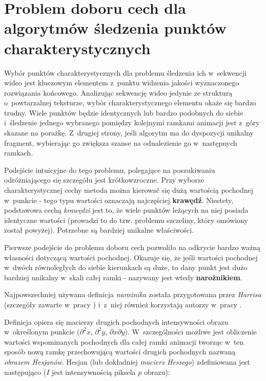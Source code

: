   \newpage
  \section{Problem doboru cech dla algorytmów śledzenia punktów charakterystycznych}\label{Section_GoodGeaturesToTrack}
    Wybór punktów charakterystycznych dla problemu śledzenia ich w~sekwencji wideo jest kluczowym elementem z~punktu widzenia jakości wyznaczonego rozwiązania końcowego. Analizując sekwencję wideo jedynie ze strukturą o~powtarzalnej teksturze, wybór charakterystycznego elementu okaże się bardzo trudny. Wiele punktów będzie identycznych lub bardzo podobnych do siebie i~śledzenie jednego wybranego pomiędzy kolejnymi ramkami animacji jest z~góry skazane na porażkę. Z~drugiej strony, jeśli algorytm ma do dyspozycji unikalny fragment, wybierając go zwiększa szanse na odnalezienie go w~następnych ramkach.

    Podejście intuicyjne do tego problemu, polegające na poszukiwaniu odróżniającego się szczegółu jest krótkowzroczne. Przy wyborze charakterystycznej cechy metoda można kierować się dużą wartością pochodnej w~punkcie - tego typu wartości oznaczają najczęściej \textbf{krawędź}. Niestety, podstawowa cechą \textit{krawędzi} jest to, że wiele punktów leżących na niej posiada identyczne wartości (prowadzi to do tzw. problemu szczeliny, który omówiony został powyżej). Potrzebne są bardziej unikalne właściwości.

    Pierwsze podejście do problemu doboru cech pozwoliło na odkrycie bardzo ważną własności dotyczącą wartości pochodnej. Okazuje się, że jeśli wartości pochodnej w~dwóch równoległych do siebie kierunkach są duże, to dany punkt jest dużo bardziej unikalny w~skali całej ramki - nazywany jest wtedy \textbf{narożnikiem}.

    Najpowszechniej używana definicja \textit{narożnika} została przygotowana przez \textit{Harrisa} (szczegóły zawarte w~pracy \cite{Harris88}) i~z~niej również korzystają autorzy w~pracy \cite{GoodFeaturesToTrack94}.

    Definicja opiera się macierzy drugich pochodnych intensywności obrazu w~określonym punkcie ($\partial^2 x$, $\partial^2 y$, $\partial x\partial y$). W~szczególności możliwe jest obliczenie wartości wspominanych pochodnych dla całej ramki animacji tworząc w~ten sposób nową ramkę przechowującą wartości drugich pochodnych nazwaną \textit{obrazem Hesjanów}. Hesjan (lub dokładniej \textit{macierz Hessego}) zdefiniowana jest następująco ($I$ jest intensywnością piksela $p$ obrazu):

